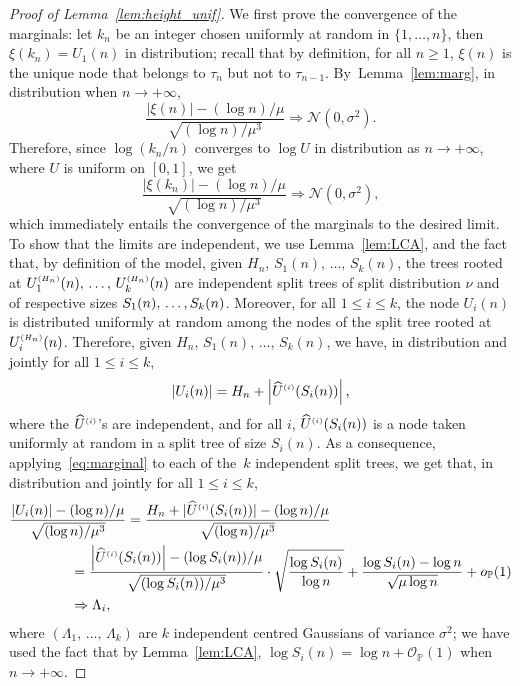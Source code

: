 \documentclass[AHL,Unicode,longabstracts,published]{cedram}
\newcommand{\sss}{\ensuremath{\scriptscriptstyle}}
\newcommand{\op}{{o_{\bbP}}}
\newcommand{\Op}{{\mathcal O_{\bbP}}}
\newcommand{\bbP}{\mathbb{P}}
\newcommand{\clN}{\mathcal{N}}
\begin{document}
\begin{proof}[Proof of Lemma~\ref{lem:height_unif}]
We first prove the convergence of the marginals: let $k_n$ be an integer chosen uniformly at random in $\{1, \ldots, n\}$, then $\xi(k_n) = U_1(n)$ in distribution; recall that by definition, for all $n\geq 1$, $\xi(n)$ is the unique node that belongs to $\tau_n$ but not to $\tau_{n-1}$. By~Lemma~\ref{lem:marg}, in distribution when $n\to+\infty$,
\[
\frac{|\xi(n)|-(\log n)/\mu}{\sqrt{(\log n)/\mu^3}}\Rightarrow\clN(0,\sigma^2).
\]
Therefore, since $\log (k_n/n)$ converges to $\log U$ in distribution as $n\to+\infty$, where $U$ is uniform on $[0,1]$, we get
\begin{equation}\label{eq:marginal}
\frac{|\xi(k_n)|-(\log n)/\mu}{\sqrt{(\log n)/\mu^3}}\Rightarrow\clN(0,\sigma^2),
\end{equation}
which immediately entails the convergence of the marginals to the desired limit. To show that the limits are independent, we use Lemma~\ref{lem:LCA}, and the fact that, by definition of the model, given $H_n$, $S_1(n), \,\ldots,\,S_k(n)$, the trees rooted at $U_1^{\sss (H_n)}(n),\,\ldots,\,U_k^{\sss (H_n)}\linebreak(n)$ are independent split trees of split distribution $\nu$ and of respective sizes $S_1(n), \,\ldots,\linebreak S_k(n)$. Moreover, for all $1\leq i\leq k$, the node $U_i(n)$ is distributed uniformly at random among the nodes of the split tree rooted at $U_i^{\sss (H_n)}(n)$. Therefore, given $H_n$, $S_1(n), \,\ldots,\,S_k(n)$, we have, in distribution and jointly for all $1\leq i\leq k$,
\[
|U_i(n)| = H_n + \left|\widehat U^{\sss (i)}(S_i(n))\right|,
\]
where the $\widehat U^{\sss (i)}$'s are independent, and for all $i$, $\widehat U^{\sss (i)}(S_i(n))$ is a node taken uniformly at random in a split tree of size $S_i(n)$. As a consequence, applying~\eqref{eq:marginal} to each of the~$k$ independent split trees, we get that, in distribution and jointly for all $1\leq i\leq k$,
\begin{align*}
\frac{|U_i(n)|-(\log n)/\mu}{\sqrt{(\log n)/\mu^3}} &= \frac{H_n + |\widehat U^{\sss (i)}(S_i(n))|-(\log n)/\mu}{\sqrt{(\log n)/\mu^3}}\\
&\hskip-4em= \frac{\left|\widehat U^{\sss (i)}(S_i(n))\right|-(\log S_i(n))/\mu}{\sqrt{(\log S_i(n))/\mu^3}}
\cdot \sqrt{\frac{\log S_i(n)}{\log n}} + \frac{\log S_i(n)-\log n}{\sqrt{\mu\log n}} +\op(1)\\
&\hskip-4em\Rightarrow \Lambda_i,
\end{align*}
where $(\Lambda_1,\,\ldots,\, \Lambda_k)$ are $k$ independent centred Gaussians of variance $\sigma^2$; we have used the fact that by Lemma~\ref{lem:LCA}, $\log S_i(n) = \log n + \Op(1)$ when $n\to+\infty$.
\end{proof}
\end{document}
